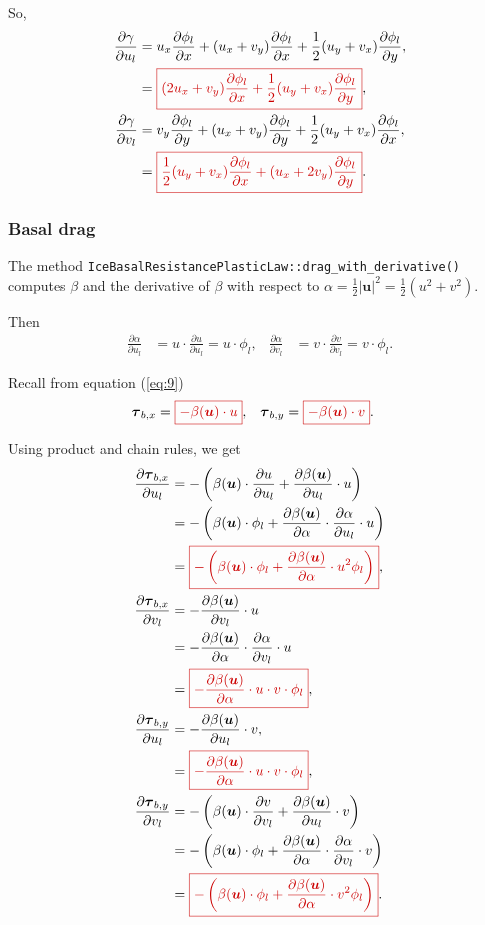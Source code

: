\documentclass{amsart}
\newcommand{\diff}[2]{\ensuremath{\frac{\partial #1}{\partial #2}}}
\newcommand{\betaU}{\beta(\boldsymbol{u})}
\newcommand{\basalshearstress}[1]{\boldsymbol{\tau}_{b#1}}
\newcommand{\taubx}{\basalshearstress{,x}}
\newcommand{\tauby}{\basalshearstress{,y}}
\newcommand{\highlight}[1]{{\color{red!80!black} \fbox{$ \displaystyle #1 $} }}
\begin{document}
So,
\begin{align}
  \diff{\gamma}{u_l} &= u_x \diff{\phi_l}{x} + (u_x + v_y)\diff{\phi_l}{x} + \frac{1}{2} (u_y + v_x)\diff{\phi_l}{y},\notag\\
                     &= \highlight{ (2 u_x + v_y) \diff{\phi_l}{x} + \frac{1}{2} (u_y + v_x)\diff{\phi_l}{y} },\\
  \diff{\gamma}{v_l} &= v_y \diff{\phi_l}{y} + (u_x + v_y)\diff{\phi_l}{y} + \frac{1}{2} (u_y + v_x)\diff{\phi_l}{x},\notag\\
                     &= \highlight{ \frac{1}{2} (u_y + v_x)\diff{\phi_l}{x} + (u_x + 2 v_y)\diff{\phi_l}{y} }.
\end{align}


\subsubsection{Basal drag}
\label{sec:basal-drag}

The method \texttt{IceBasalResistancePlasticLaw::drag_with_derivative()} computes $\beta$ and the derivative of $\beta$ with respect to $\alpha = \frac12 |\boldsymbol{u}|^2 = \frac12 (u^2 + v^2)$.

Then
\begin{align*}
  \diff{\alpha}{u_l} &= u\cdot \diff{u}{u_l} = u\cdot \phi_l,&
  \diff{\alpha}{v_l} &= v\cdot \diff{v}{v_l} = v\cdot \phi_l.
\end{align*}

Recall from equation (\ref{eq:9})
\begin{align*}
  \taubx &=  \highlight{ - \betaU\cdot u }, &  \tauby &= \highlight{ - \betaU\cdot v }.
\end{align*}

Using product and chain rules, we get
\begin{align*}
  \diff{\taubx}{u_l} &= -\left(\betaU\cdot \diff{u}{u_l} + \diff{\betaU}{u_l}\cdot u\right)\\
                     &= -\left( \betaU\cdot \phi_l + \diff{\betaU}{\alpha}\cdot \diff{\alpha}{u_l}\cdot u \right)\\
                     &= \highlight{ -\left( \betaU\cdot \phi_l + \diff{\betaU}{\alpha}\cdot u^2 \phi_l \right) },\\
  \diff{\taubx}{v_l} &= -\diff{\betaU}{v_l}\cdot u\\
                     &= -\diff{\betaU}{\alpha}\cdot \diff{\alpha}{v_l}\cdot u\\
                     &= \highlight{ -\diff{\betaU}{\alpha}\cdot u\cdot v \cdot \phi_l },\\
  \diff{\tauby}{u_l} &= -\diff{\betaU}{u_l}\cdot v,\\
                     &= \highlight{ -\diff{\betaU}{\alpha}\cdot u\cdot v \cdot \phi_l },\\
  \diff{\tauby}{v_l} &= -\left( \betaU\cdot \diff{v}{v_l} + \diff{\betaU}{u_l}\cdot v \right)\\
                     &= -\left( \betaU\cdot \phi_l + \diff{\betaU}{\alpha}\cdot \diff{\alpha}{v_l}\cdot v \right)\\
                     &= \highlight{ -\left( \betaU\cdot \phi_l + \diff{\betaU}{\alpha}\cdot v^2 \phi_l \right) }.
\end{align*}
\end{document}
